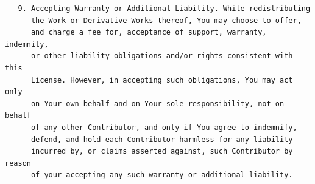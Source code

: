 \begin{verbatim}
   9. Accepting Warranty or Additional Liability. While redistributing
      the Work or Derivative Works thereof, You may choose to offer,
      and charge a fee for, acceptance of support, warranty, indemnity,
      or other liability obligations and/or rights consistent with this
      License. However, in accepting such obligations, You may act only
      on Your own behalf and on Your sole responsibility, not on behalf
      of any other Contributor, and only if You agree to indemnify,
      defend, and hold each Contributor harmless for any liability
      incurred by, or claims asserted against, such Contributor by reason
      of your accepting any such warranty or additional liability.
\end{verbatim}

